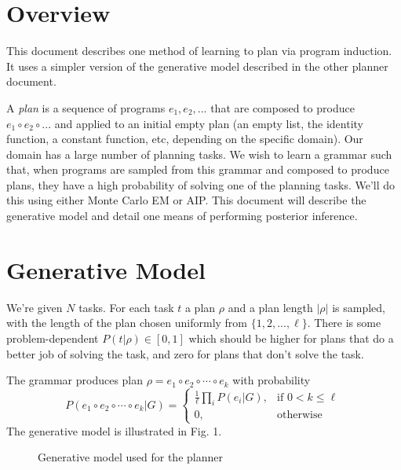 \documentclass{article}
\begin{document}
\section{Overview}
This document describes one method of learning to plan via program induction.
It uses a simpler version of the generative model described in the other planner document.

A \emph{plan} is a sequence of programs $e_1, e_2, ...$ that are composed to produce $e_1\circ e_2 \circ ...$ and applied to an initial empty plan (an empty list, the identity function, a constant function, etc, depending on the specific domain).
Our domain has a large number of planning tasks.
We wish to learn a grammar such that, when programs are sampled from this grammar and composed to produce plans, they have a high probability of solving one of the planning tasks.
We'll do this using either Monte Carlo EM or AIP.
This document will describe the generative model and detail one means of performing posterior inference.

\section{Generative Model}
We're given $N$ tasks.
For each task $t$ a plan $\rho$ and a plan length $|\rho|$ is sampled, with the length of the plan chosen uniformly from $\{1,2,...,\ell\}$.
There is some problem-dependent $P(t | \rho)\in[0,1]$ which should be higher for plans that do a better job of solving the task, and zero for plans that don't solve the task.

The grammar produces plan $\rho = e_1\circ e_2\circ \cdots \circ e_k$ with probability
$$
P\left( e_1\circ e_2\circ \cdots \circ e_k | G \right) =
\begin{cases}
    \frac{1}{\ell}\prod_i P(e_i | G),& \text{if } 0<k\leq \ell\\
    0,              & \text{otherwise}
\end{cases}
$$
The generative model is illustrated in Fig. 1.

\begin{figure}
\centering
{}
\caption{Generative model used for the planner}
\end{figure}
\end{document}
